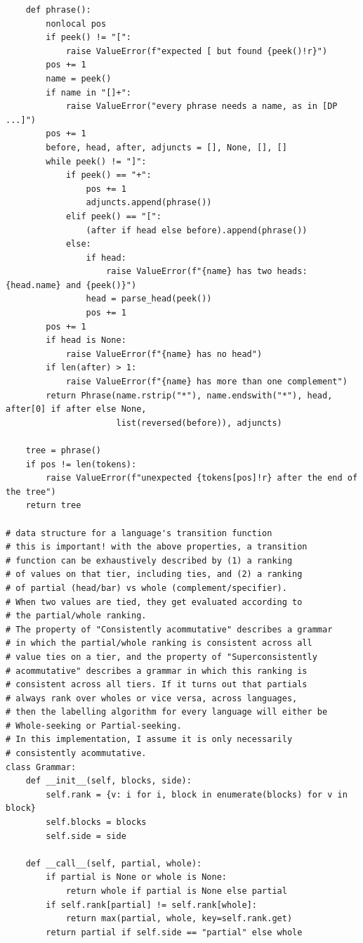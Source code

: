 \begin{verbatim}
    def phrase():
        nonlocal pos
        if peek() != "[":
            raise ValueError(f"expected [ but found {peek()!r}")
        pos += 1
        name = peek()
        if name in "[]+":
            raise ValueError("every phrase needs a name, as in [DP ...]")
        pos += 1
        before, head, after, adjuncts = [], None, [], []
        while peek() != "]":
            if peek() == "+":
                pos += 1
                adjuncts.append(phrase())
            elif peek() == "[":
                (after if head else before).append(phrase())
            else:
                if head:
                    raise ValueError(f"{name} has two heads: {head.name} and {peek()}")
                head = parse_head(peek())
                pos += 1
        pos += 1
        if head is None:
            raise ValueError(f"{name} has no head")
        if len(after) > 1:
            raise ValueError(f"{name} has more than one complement")
        return Phrase(name.rstrip("*"), name.endswith("*"), head, after[0] if after else None,
                      list(reversed(before)), adjuncts)

    tree = phrase()
    if pos != len(tokens):
        raise ValueError(f"unexpected {tokens[pos]!r} after the end of the tree")
    return tree

# data structure for a language's transition function
# this is important! with the above properties, a transition
# function can be exhaustively described by (1) a ranking
# of values on that tier, including ties, and (2) a ranking
# of partial (head/bar) vs whole (complement/specifier).
# When two values are tied, they get evaluated according to
# the partial/whole ranking. 
# The property of "Consistently acommutative" describes a grammar
# in which the partial/whole ranking is consistent across all
# value ties on a tier, and the property of "Superconsistently
# acommutative" describes a grammar in which this ranking is
# consistent across all tiers. If it turns out that partials
# always rank over wholes or vice versa, across languages, 
# then the labelling algorithm for every language will either be
# Whole-seeking or Partial-seeking. 
# In this implementation, I assume it is only necessarily
# consistently acommutative. 
class Grammar:
    def __init__(self, blocks, side):
        self.rank = {v: i for i, block in enumerate(blocks) for v in block}
        self.blocks = blocks
        self.side = side

    def __call__(self, partial, whole):
        if partial is None or whole is None:
            return whole if partial is None else partial
        if self.rank[partial] != self.rank[whole]:
            return max(partial, whole, key=self.rank.get)
        return partial if self.side == "partial" else whole


\end{verbatim}

